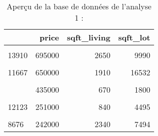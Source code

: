 \documentclass[
  11pt,
  french,
]{article}
\begin{document}
\begin{table}[!h]

\caption{\label{tab:unnamed-chunk-12}Aperçu de la base de données de l'analyse 1 :}
\centering
\begin{tabular}[t]{lrrr}
\toprule
  & price & sqft\_living & sqft\_lot\\
\midrule
\cellcolor{gray!6}{4789} & \cellcolor{gray!6}{716100} & \cellcolor{gray!6}{1640} & \cellcolor{gray!6}{4000}\\
13910 & 695000 & 2650 & 9990\\
\cellcolor{gray!6}{8533} & \cellcolor{gray!6}{350000} & \cellcolor{gray!6}{900} & \cellcolor{gray!6}{6380}\\
11667 & 650000 & 1910 & 16532\\
\cellcolor{gray!6}{12078} & \cellcolor{gray!6}{285000} & \cellcolor{gray!6}{1930} & \cellcolor{gray!6}{7200}\\
\addlinespace
18904 & 435000 & 670 & 1800\\
\cellcolor{gray!6}{16764} & \cellcolor{gray!6}{829000} & \cellcolor{gray!6}{2690} & \cellcolor{gray!6}{10443}\\
12123 & 251000 & 840 & 4495\\
\cellcolor{gray!6}{19044} & \cellcolor{gray!6}{872000} & \cellcolor{gray!6}{2860} & \cellcolor{gray!6}{40284}\\
8676 & 242000 & 2340 & 7494\\
\bottomrule
\end{tabular}
\end{table}
\end{document}
